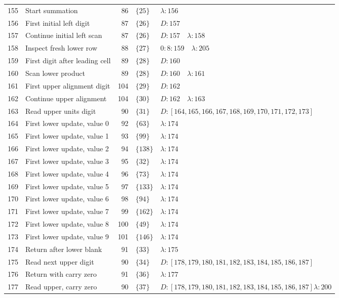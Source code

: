 \documentclass[11pt,a4paper]{article}
\newcommand{\blank}{\lambda}
\begin{document}
\begin{longtable}{r p{4.0cm} r l p{8.1cm}}
155 & Start summation & 86 & $\{25\}$ & $\blank:156$ \\
156 & First initial left digit & 87 & $\{26\}$ & $D:157$ \\
157 & Continue initial left scan & 87 & $\{26\}$ & $D:157\quad \blank:158$ \\
158 & Inspect fresh lower row & 88 & $\{27\}$ & $0{:}8:159\quad \blank:205$ \\
159 & First digit after leading cell & 89 & $\{28\}$ & $D:160$ \\
160 & Scan lower product & 89 & $\{28\}$ & $D:160\quad \blank:161$ \\
161 & First upper alignment digit & 104 & $\{29\}$ & $D:162$ \\
162 & Continue upper alignment & 104 & $\{30\}$ & $D:162\quad \blank:163$ \\
163 & Read upper units digit & 90 & $\{31\}$ & $D:[164,165,166,167,168,169,170,171,172,173]$ \\
164 & First lower update, value 0 & 92 & $\{63\}$ & $\blank:174$ \\
165 & First lower update, value 1 & 93 & $\{99\}$ & $\blank:174$ \\
166 & First lower update, value 2 & 94 & $\{138\}$ & $\blank:174$ \\
167 & First lower update, value 3 & 95 & $\{32\}$ & $\blank:174$ \\
168 & First lower update, value 4 & 96 & $\{73\}$ & $\blank:174$ \\
169 & First lower update, value 5 & 97 & $\{133\}$ & $\blank:174$ \\
170 & First lower update, value 6 & 98 & $\{94\}$ & $\blank:174$ \\
171 & First lower update, value 7 & 99 & $\{162\}$ & $\blank:174$ \\
172 & First lower update, value 8 & 100 & $\{49\}$ & $\blank:174$ \\
173 & First lower update, value 9 & 101 & $\{146\}$ & $\blank:174$ \\
174 & Return after lower blank & 91 & $\{33\}$ & $\blank:175$ \\
175 & Read next upper digit & 90 & $\{34\}$ & $D:[178,179,180,181,182,183,184,185,186,187]$ \\
176 & Return with carry zero & 91 & $\{36\}$ & $\blank:177$ \\
177 & Read upper, carry zero & 90 & $\{37\}$ & $D:[178,179,180,181,182,183,184,185,186,187]$\newline$\blank:200$ \\

\end{longtable}
\end{document}
